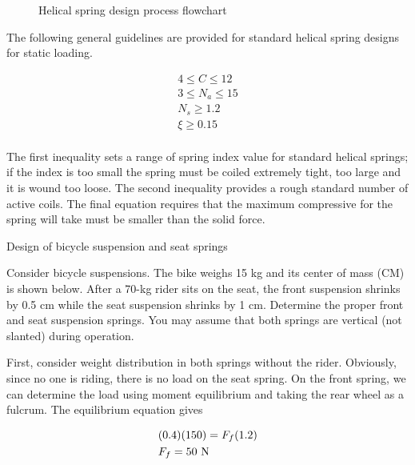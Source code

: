 \documentclass[a4paper,openany,12pt]{book}
\begin{document}
{{\begin{figure}[h]
  \caption{Helical spring design process flowchart}
  \label{fig: spring design flowchart}
\end{figure}

The following general guidelines are provided for standard helical
spring designs for static loading.

$$\begin{gathered}
    4 \leqslant C \leqslant 12 \\ 
    3 \leqslant N_a \leqslant 15 \\ 
    N_s \geqslant 1.2 \\ 
    \xi  \geqslant 0.15 \\ 
  \end{gathered}$$

The first inequality sets a range of spring index value for standard
helical springs; if the index is too small the spring must be coiled
extremely tight, too large and it is wound too loose. The second
inequality provides a rough standard number of active coils. The final
equation requires that the maximum compressive for the spring will take
must be smaller than the solid force.

Design of bicycle suspension and seat springs

Consider bicycle suspensions. The bike weighs 15 kg and its center of
mass (CM) is shown below. After a 70-kg rider sits on the seat, the
front suspension shrinks by 0.5 cm while the seat suspension shrinks by
1 cm. Determine the proper front and seat suspension springs. You may
assume that both springs are vertical (not slanted) during operation.

First, consider weight distribution in both springs without the rider.
Obviously, since no one is riding, there is no load on the seat spring.
On the front spring, we can determine the load using moment equilibrium
and taking the rear wheel as a fulcrum. The equilibrium equation gives

$$\begin{gathered}
      (0.4)(150) = F_f(1.2) \hfill \\
      F_f = 50 \text{ N} \hfill \\ 
    \end{gathered}$$

}}
\end{document}
